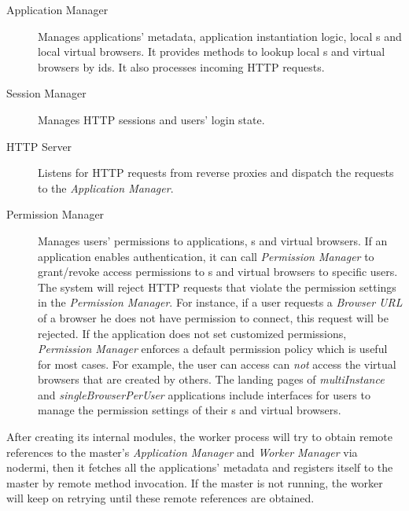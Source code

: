 \begin{description}

\item[Application Manager] Manages applications' metadata, application instantiation
logic, local \appins{}s
and local virtual browsers. It provides methods to lookup local \appins{}s and virtual
browsers by ids. It also processes incoming HTTP requests.

\item[Session Manager] Manages HTTP sessions and users' login state. 

\item[HTTP Server] Listens for HTTP requests from reverse proxies and dispatch the requests
to the \emph{Application Manager}. 

\item[Permission Manager] 
Manages users' permissions to applications, \appins{}s and virtual browsers.
If an application enables authentication, it can call \emph{Permission
Manager} to grant/revoke access permissions to  \appins{}s and virtual
browsers to specific users. The system will reject HTTP requests that violate
the permission settings in the  \emph{Permission Manager}. For instance, if a
user requests a \emph{Browser URL} of a browser he does not have permission to
connect, this request will be rejected. If the application does not set
customized permissions, \emph{Permission Manager} enforces a default
permission policy which is useful for most cases.  For example, the user can
access  can \emph{not} access the virtual browsers that are created by others.
The landing pages of \emph{multiInstance} and \emph{singleBrowserPerUser}
applications include interfaces for users to manage the permission settings of
their \appins{}s and virtual browsers.

\end{description}



After creating its internal modules, the worker process will try to obtain
remote references to the master's \emph{Application Manager} and \emph{Worker
Manager} via nodermi, then it fetches all the applications' metadata and
registers itself to the master by remote method invocation. If the master is
not running, the worker will keep on retrying until these remote references
are obtained.


